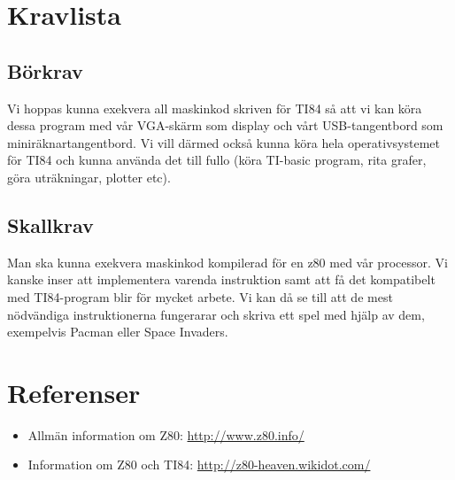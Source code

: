 \documentclass[12pt]{article}
\begin{document}
\section{Kravlista}
\subsection{Börkrav}
    Vi hoppas kunna exekvera all maskinkod skriven för TI84 så att vi kan köra
    dessa program med vår VGA-skärm som display och vårt USB-tangentbord som
    miniräknartangentbord. Vi vill därmed också kunna köra hela
    operativsystemet för TI84 och kunna använda det till fullo (köra TI-basic
    program, rita grafer, göra uträkningar, plotter etc).

\subsection{Skallkrav}
    Man ska kunna exekvera maskinkod kompilerad för en z80 med vår processor.
    Vi kanske inser att implementera varenda instruktion samt att få det
    kompatibelt med TI84-program blir för mycket arbete. Vi kan då se till att
    de mest nödvändiga instruktionerna fungerarar och skriva ett
    spel med hjälp av dem, exempelvis Pacman eller Space Invaders.

\section{Referenser}
\begin{itemize}
    \item Allmän information om Z80: \url{http://www.z80.info/}
    \item Information om Z80 och TI84: \url{http://z80-heaven.wikidot.com/}
\end{itemize}
\end{document}
